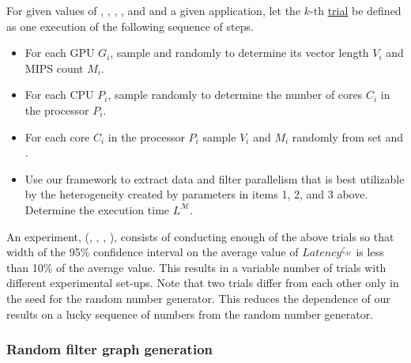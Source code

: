 For given values of \numtplgynodes, \gpunum, \veclenset, \corenumset,
and \mipsset and a given application, let the $k$-th \ul{trial} be
defined as one execution of the following sequence of steps.

\begin{itemize}

\item For each GPU $G_i$, sample \veclenset and \mipsset randomly to
  determine its vector length $V_i$ and MIPS count $M_i$. \label{i1}

\item For each CPU $P_i$, sample \corenumset randomly to determine the
  number of cores $C_i$ in the processor $P_i$.~\label{i2}

\item For each core $C_i$ in the processor $P_i$ sample $V_i$ and $M_i$
  randomly from set \veclenset and \mipsset.

\item Use our framework to extract data and filter parallelism that is
  best utilizable by the heterogeneity created by parameters in items 1,
  2, and 3 above. Determine the execution time
  $L^{\mathcal{M}}$.

\end{itemize}

An experiment, \expt(\numtplgynodes, \gpunum, \veclenset, \corenumset
\mipsset), consists of conducting enough of the above trials so that
width of the 95\% confidence interval on the average value of
$Latency^{\zeta_\mathcal{M}}$ is less than 10\% of the average
value. This results in a variable number of trials with different
experimental set-ups. Note that two trials differ from each other only in
the seed for the random number generator.  This reduces the dependence
of our results on a lucky sequence of numbers from the random number
generator.

\subsubsection{Random filter graph generation}
\label{sec:filter-graph-setup}


